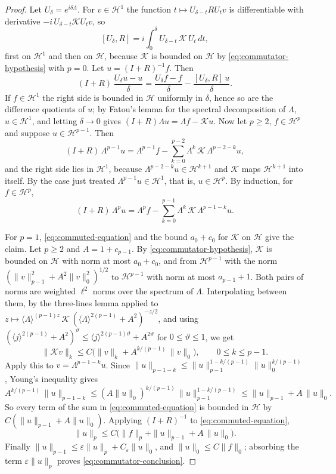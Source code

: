 \begin{proof}
Let $U_\delta=e^{i\delta\Lambda}$. For $v\in\mathcal H^1$ the function
$t\mapsto U_{\delta-t}RU_tv$ is differentiable with derivative
$-i\,U_{\delta-t}\mathscr KU_tv$, so
\[
 [U_\delta,R]=i\int_0^\delta U_{\delta-t}\,\mathscr K\,U_t\,dt ,
\]
first on $\mathcal H^1$ and then on $\mathcal H$, because
$\mathscr K$ is bounded on $\mathcal H$ by
\eqref{eq:commutator-hypothesis} with $p=0$. Let $u=(I+R)^{-1}f$.
Then
\[
 (I+R)\,\frac{U_\delta u-u}{\delta}
 =\frac{U_\delta f-f}{\delta}-\frac{[U_\delta,R]\,u}{\delta}.
\]
If $f\in\mathcal H^1$ the right side is bounded in $\mathcal H$
uniformly in $\delta$, hence so are the difference quotients of $u$;
by Fatou's lemma for the spectral decomposition of $\Lambda$,
$u\in\mathcal H^1$, and letting $\delta\to0$ gives
$(I+R)\Lambda u=\Lambda f-\mathscr Ku$. Now let $p\ge2$, $f\in\mathcal H^p$
and suppose $u\in\mathcal H^{p-1}$. Then
\[
 (I+R)\,\Lambda^{p-1}u=\Lambda^{p-1}f
 -\sum_{k=0}^{p-2}\Lambda^k\,\mathscr K\,\Lambda^{p-2-k}u ,
\]
and the right side lies in $\mathcal H^1$, because
$\Lambda^{p-2-k}u\in\mathcal H^{k+1}$ and $\mathscr K$ maps
$\mathcal H^{k+1}$ into itself. By the case just treated
$\Lambda^{p-1}u\in\mathcal H^1$, that is, $u\in\mathcal H^p$. By
induction, for $f\in\mathcal H^p$,
\begin{equation}\label{eq:commuted-equation}
 (I+R)\,\Lambda^pu=\Lambda^pf
 -\sum_{k=0}^{p-1}\Lambda^k\,\mathscr K\,\Lambda^{p-1-k}u .
\end{equation}

For $p=1$, \eqref{eq:commuted-equation} and the bound $a_0+c_0$ for
$\mathscr K$ on $\mathcal H$ give the claim. Let $p\ge2$ and
$A=1+c_{p-1}$. By \eqref{eq:commutator-hypothesis}, $\mathscr K$ is
bounded on $\mathcal H$ with norm at most $a_0+c_0$, and from
$\mathcal H^{p-1}$ with the norm
$(\|v\|_{p-1}^2+A^2\|v\|_0^2)^{1/2}$ to $\mathcal H^{p-1}$ with norm
at most $a_{p-1}+1$. Both pairs of norms are weighted $\ell^2$ norms over
the spectrum of $\Lambda$. Interpolating between them, by the
three-lines lemma applied to
$z\mapsto\langle\Lambda\rangle^{(p-1)z}\,\mathscr K\,
(\langle\Lambda\rangle^{2(p-1)}+A^2)^{-z/2}$, and using
$(\langle j\rangle^{2(p-1)}+A^2)^{\vartheta}
\le\langle j\rangle^{2(p-1)\vartheta}+A^{2\vartheta}$ for
$0\le\vartheta\le1$, we get
\[
 \|\mathscr Kv\|_k\le C\bigl(\|v\|_k+A^{k/(p-1)}\,\|v\|_0\bigr),
 \qquad 0\le k\le p-1 .
\]
Apply this to $v=\Lambda^{p-1-k}u$. Since
$\|u\|_{p-1-k}\le\|u\|_{p-1}^{1-k/(p-1)}\|u\|_0^{k/(p-1)}$, Young's
inequality gives
\[
 A^{k/(p-1)}\,\|u\|_{p-1-k}
 \le(A\|u\|_0)^{k/(p-1)}\,\|u\|_{p-1}^{1-k/(p-1)}
 \le\|u\|_{p-1}+A\,\|u\|_0 .
\]
So every term of the sum in \eqref{eq:commuted-equation} is bounded
in $\mathcal H$ by $C(\|u\|_{p-1}+A\|u\|_0)$. Applying $(I+R)^{-1}$
to \eqref{eq:commuted-equation},
\[
 \|u\|_p\le C\bigl(\|f\|_p+\|u\|_{p-1}+A\,\|u\|_0\bigr).
\]
Finally $\|u\|_{p-1}\le\varepsilon\|u\|_p+C_\varepsilon\|u\|_0$, and
$\|u\|_0\le C\|f\|_0$; absorbing the term $\varepsilon\|u\|_p$ proves
\eqref{eq:commutator-conclusion}.
\end{proof}

